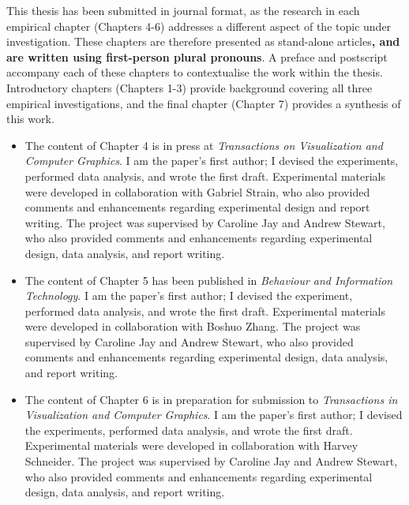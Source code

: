 This thesis has been submitted in journal format, as the research in each empirical chapter (Chapters 4-6) addresses a different aspect of the topic under investigation. These chapters are therefore presented as stand-alone articles\textbf{, and are written using first-person plural pronouns}. A preface and postscript accompany each of these chapters to contextualise the work within the thesis. Introductory chapters (Chapters 1-3) provide background covering all three empirical investigations, and the final chapter (Chapter 7) provides a synthesis of this work.

\begin{itemize} 
\item The content of Chapter 4 is in press at \textit{Transactions on Visualization and Computer Graphics}. I am the paper’s first author; I devised the experiments, performed data analysis, and wrote the first draft. Experimental materials were developed in collaboration with Gabriel Strain, who also provided comments and enhancements regarding experimental design and report writing. The project was supervised by Caroline Jay and Andrew Stewart, who also provided comments and enhancements regarding experimental design, data analysis, and report writing.
\item The content of Chapter 5 has been published in \textit{Behaviour and Information Technology}. I am the paper’s first author; I devised the experiment, performed data analysis, and wrote the first draft. Experimental materials were developed in collaboration with Boshuo Zhang. The project was supervised by Caroline Jay and Andrew Stewart, who also provided comments and enhancements regarding experimental design, data analysis, and report writing.
\item The content of Chapter 6 is in preparation for submission to \textit{Transactions in Visualization and Computer Graphics}. I am the paper’s first author; I devised the experiments, performed data analysis, and wrote the first draft. Experimental materials were developed in collaboration with Harvey Schneider. The project was supervised by Caroline Jay and Andrew Stewart, who also provided comments and enhancements regarding experimental design, data analysis, and report writing.\\
\end{itemize} 